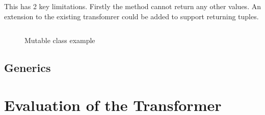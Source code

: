 \documentclass[ oneside,%
                    author={James Elgar},
                    degree={MEng},
                     title={Bidirectional transformer between functional and \\ object-oriented programming in Rust},
                  subtitle={}]{dissertation}
\newcommand{\codefile}[2]{\inputminted[xleftmargin=20pt,linenos, breaklines]{#1}{#2}}
\newcommand{\rustfile}[1]{\codefile{rust}{../#1.rs}}
\newcommand{\rustexample}[1]{\rustfile{examples/src/#1}}
\begin{document}
This has 2 key limitations. Firstly the method cannot return any other values. An extension to the existing transfomrer could be added to support returning tuples.



\begin{figure}
\centering
\rustexample{mutable/oop-basic}
\caption{Mutable class example}
\label{fig:mutable-example}
\end{figure}

\section{Generics}




% 


\chapter{Evaluation of the Transformer}
\label{chap:evaluation}
\end{document}
